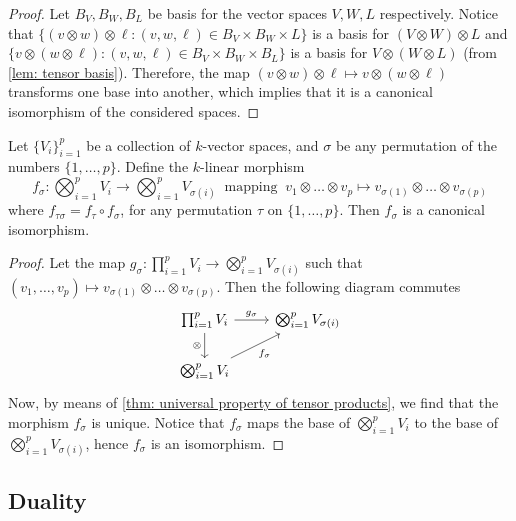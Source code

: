 \begin{proof}
  Let \(B_V, B_W, B_L\) be basis for the vector spaces \(V, W, L\) respectively.
  Notice that \(\{(v \otimes w) \otimes \ell : (v, w, \ell) \in B_V \times B_W
  \times L\}\) is a basis for \((V \otimes W) \otimes L\) and \(\{v \otimes (w
  \otimes \ell) : (v, w, \ell) \in B_V \times B_W \times B_L\}\) is a basis for
  \(V \otimes (W \otimes L)\) (from \cref{lem: tensor basis}). Therefore, the
  map \((v \otimes w) \otimes \ell \mapsto v \otimes (w \otimes \ell)\)
  transforms one base into another, which implies that it is a canonical
  isomorphism of the considered spaces.
\end{proof}

\begin{proposition}[Commutativity]\label{prop: commutativity tensor prod}
  Let \(\{V_i\}_{i=1}^p\) be a collection of \(k\)-vector spaces, and \(\sigma\)
  be any permutation of the numbers \(\{1, \dots, p\}\). Define the \(k\)-linear
  morphism
  \[
    f_\sigma : \bigotimes_{i=1}^p V_i \to \bigotimes_{i=1}^p V_{\sigma(i)}\
    \text{ mapping }\ v_1 \otimes \dots \otimes v_p \mapsto v_{\sigma(1)}
    \otimes \dots \otimes v_{\sigma(p)}
  \]
  where \(f_{\tau\sigma} = f_\tau \circ f_\sigma\), for any permutation \(\tau\)
  on \(\{1, \dots, p\}\). Then \(f_\sigma\) is a canonical isomorphism.
\end{proposition}

\begin{proof}
  Let the map \(g_\sigma: \prod_{i=1}^p V_i \to \bigotimes_{i=1}^p
  V_{\sigma(i)}\) such that \((v_1, \dots, v_p) \mapsto v_{\sigma(1)} \otimes
  \dots \otimes v_{\sigma(p)}\). Then the following diagram commutes
  \[
    \begin{tikzcd}
      \prod_{i=1}^p V_i \ar[r, "g_\sigma"] \ar[d, swap, "\otimes"]
        &\bigotimes_{i=1}^p V_{\sigma(i)}\\
      \bigotimes_{i=1}^p V_i \ar[ur, swap, "f_\sigma"]
    \end{tikzcd}
  \]
  Now, by means of \cref{thm: universal property of tensor products}, we find
  that the morphism \(f_\sigma\) is unique. Notice that \(f_\sigma\) maps the
  base of \(\bigotimes_{i=1}^p V_i\) to the base of \(\bigotimes_{i=1}^p
  V_{\sigma(i)}\), hence \(f_\sigma\) is an isomorphism.
\end{proof}

\subsection{Duality}

